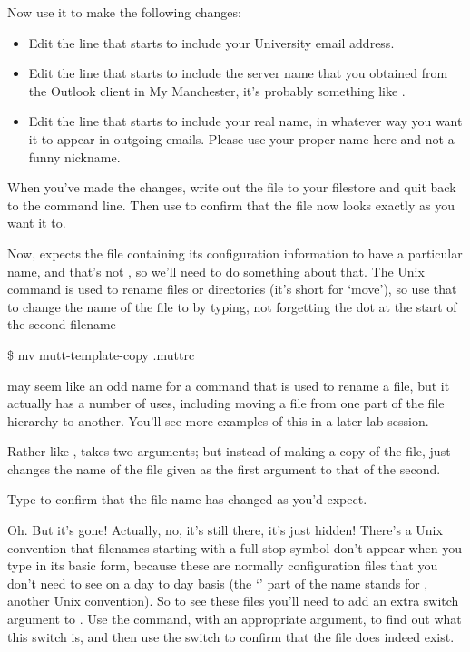 Now use it to make the following changes:

\begin{itemize}
\item Edit the line that starts  to include your University email address.
\item Edit the line that starts  to include the server name that you obtained from the Outlook client in My Manchester, it's probably something like .
\item Edit the line that starts  to include your real name, in whatever way you want it to appear in outgoing emails. Please use your proper name here and not a funny nickname.
\end{itemize}

When you've made the changes, write out the file to your filestore and quit back to the command line. Then use  to confirm that the file now looks exactly as you want it to. 

Now,  expects the file containing its configuration information to have a particular name, and that's not , so we'll need to do something about that. The Unix  command is used to rename files or directories (it's short for `move'), so use that to change the name of the file to  by typing, not forgetting the dot at the start of the second filename


\begin{ttoutenv}
\$ mv mutt-template-copy .muttrc
\end{ttoutenv}


 may seem like an odd name for a command that is used to rename a file, but it actually has a number of uses, including moving a file from one part of the file hierarchy to another. You'll see more examples of this in a later lab session.

Rather like ,  takes two arguments; but instead of making a copy of the file,  just changes the name of the file given as the first argument to that of the second. 

Type  to confirm that the file name has changed as you'd expect. 

Oh. But it's gone! Actually, no, it's still there, it's just hidden! There's a Unix convention that filenames  starting with a full-stop symbol don't appear when you type  in its basic form, because these are normally configuration files that you don't need to see on a day to day basis (the `' part of the  name stands for , another Unix convention). So to see these files you'll need to add an extra switch argument to . Use the  command, with an appropriate argument, to find out what this switch is, and then use the switch to confirm that the  file does indeed exist. 


